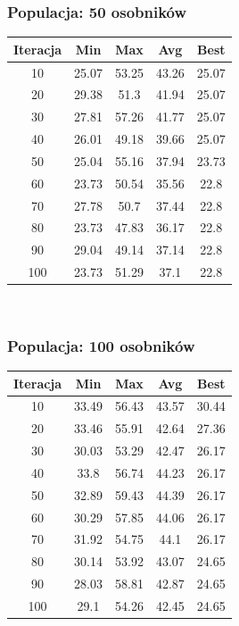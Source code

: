 \documentclass[a4paper,11pt]{article}
\begin{document}
			\subsubsection{Populacja: 50 osobników}
				\begin{tabular}{|c|c|c|c|c|}
					\hline 
					Iteracja &  Min &  Max & Avg & Best\\
					\hline
					10 & 25.07 & 53.25 & 43.26 & 25.07\\
					\hline
					20 & 29.38 & 51.3 & 41.94 & 25.07\\
					\hline
					30 & 27.81 & 57.26 & 41.77 & 25.07\\
					\hline
					40 & 26.01 & 49.18 & 39.66 & 25.07\\
					\hline
					50 & 25.04 & 55.16 & 37.94 & 23.73\\
					\hline
					60 & 23.73 & 50.54 & 35.56 & 22.8\\
					\hline
					70 & 27.78 & 50.7 & 37.44 & 22.8\\
					\hline
					80 & 23.73 & 47.83 & 36.17 & 22.8\\
					\hline
					90 & 29.04 & 49.14 & 37.14 & 22.8\\
					\hline
					100 & 23.73 & 51.29 & 37.1 & 22.8\\
					\hline
				\end{tabular} \\
			\subsubsection{Populacja: 100 osobników}
				\begin{tabular}{|c|c|c|c|c|}
					\hline 
					Iteracja &  Min &  Max & Avg & Best\\
					\hline
					10 & 33.49 & 56.43 & 43.57 & 30.44\\
					\hline
					20 & 33.46 & 55.91 & 42.64 & 27.36\\
					\hline
					30 & 30.03 & 53.29 & 42.47 & 26.17\\
					\hline
					40 & 33.8 & 56.74 & 44.23 & 26.17\\
					\hline
					50 & 32.89 & 59.43 & 44.39 & 26.17\\
					\hline
					60 & 30.29 & 57.85 & 44.06 & 26.17\\
					\hline
					70 & 31.92 & 54.75 & 44.1 & 26.17\\
					\hline
					80 & 30.14 & 53.92 & 43.07 & 24.65\\
					\hline
					90 & 28.03 & 58.81 & 42.87 & 24.65\\
					\hline
					100 & 29.1 & 54.26 & 42.45 & 24.65\\
					\hline
				\end{tabular} \\
\end{document}
